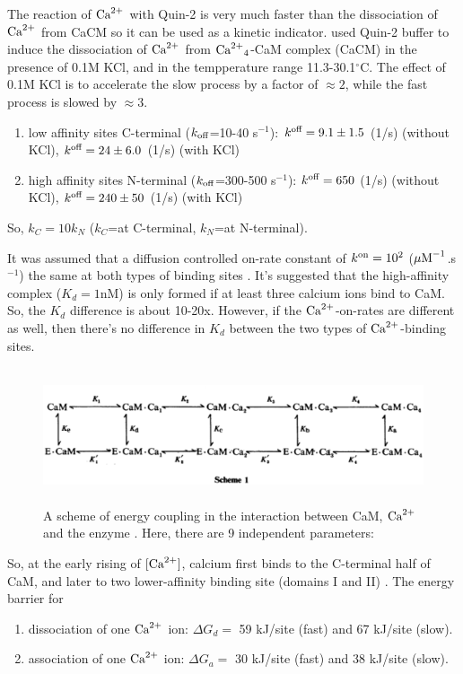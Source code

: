The reaction of ${\text{Ca}^{2+}}$ with Quin-2 is very much faster than the dissociation of
${\text{Ca}^{2+}}$ from CaCM so it can be used as a kinetic indicator. \citep{martin1985}
used Quin-2 buffer to induce the dissociation of ${\text{Ca}^{2+}}$ from ${\text{Ca}^{2+}}_4$-CaM complex
(CaCM) in the presence of 0.1M KCl, and in the tempperature range
11.3-30.1$^\circ$C. The effect of 0.1M KCl is to accelerate the slow process by
a factor of $\approx 2$, while the fast process is slowed by $\approx 3$.
\begin{enumerate}
  \item low affinity sites C-terminal ($k_{\text{off}}$=10-40 s$^{-1}$): $k^{\text{off}} =
  9.1\pm 1.5$ (1/s) (without KCl), $k^{\text{off}} = 24\pm 6.0$ (1/s) (with KCl)
  \item high affinity sites N-terminal ($k_{\text{off}}$=300-500 s$^{-1}$): $k^{\text{off}} =
  650$ (1/s) (without KCl), $k^{\text{off}} = 240\pm 50$ (1/s) (with KCl) 
\end{enumerate} 
So, $k_C=10k_N$ ($k_C$=at C-terminal, $k_N$=at N-terminal).

It was assumed that a diffusion controlled on-rate constant of $k^{\text{on}}=10^2$
(${\mu\text{M}}^{-1}$.s$^{-1}$) the same at both types of binding sites
\citep{eigen1962}. It's suggested that the high-affinity complex ($K_d=1$nM) is
only formed if at least three calcium ions bind to CaM. So, the $K_d$ difference
is about 10-20x. However, if the ${\text{Ca}^{2+}}$-on-rates are different as well, then
there's no difference  in $K_d$ between the two types of  ${\text{Ca}^{2+}}$-binding sites. 


\begin{figure}[hbt]
  \centerline{\includegraphics[height=4cm,
    angle=0]{./images/Enzyme_CaCM_scheme.eps} }
\caption{A scheme of energy coupling in the interaction between CaM, ${\text{Ca}^{2+}}$ and
the enzyme \citep{cox1988}. Here, there are 9 independent parameters: }
\label{fig:LCC_diagram}
\end{figure}

So, at the early rising of $[{\text{Ca}^{2+}}]$, calcium first binds to the C-terminal half
of CaM, and later to two lower-affinity binding site (domains I and II)
\cite{cox1988}. The energy barrier for
\begin{enumerate}
  \item dissociation of one ${\text{Ca}^{2+}}$ ion: $\Delta G_d=$ 59 kJ/site
(fast) and 67  kJ/site (slow).
\item association of one ${\text{Ca}^{2+}}$ ion: $\Delta G_a=$ 30 kJ/site (fast) and 38
kJ/site (slow).
\end{enumerate}



